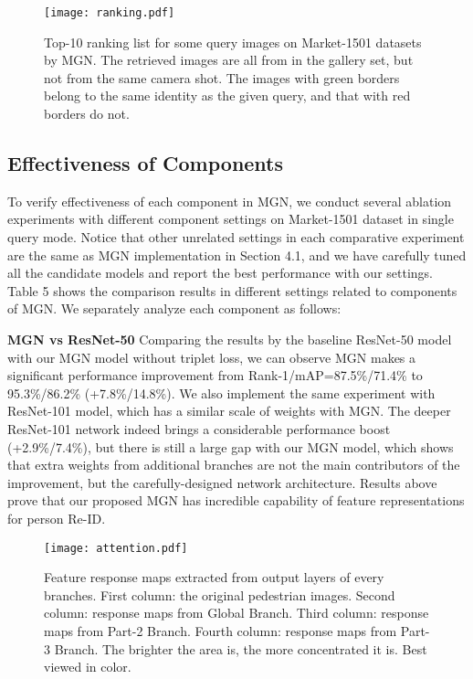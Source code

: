 \documentclass[sigconf]{acmart}
\begin{document}
\begin{figure*}
	\texttt{[image: ranking.pdf]}
	\caption{Top-10 ranking list for some query images on Market-1501 datasets by MGN. The retrieved images are all from in the gallery set, but not from the same camera shot. The images with green borders belong to the same identity as the given query, and that with red borders do not. }
\end{figure*}

\subsection{Effectiveness of Components}
To verify effectiveness of each component in MGN, we conduct several ablation experiments with different component settings on Market-1501 dataset in single query mode. Notice that other unrelated settings in each comparative experiment are the same as MGN implementation in Section 4.1, and we have carefully tuned all the candidate models and report the best performance with our settings. Table 5 shows the comparison results in different settings related to components of MGN. We separately analyze each component as follows: 

\textbf{MGN vs ResNet-50} Comparing the results by the baseline ResNet-50 model with our MGN model without triplet loss, we can observe MGN makes a significant performance improvement from Rank-1/mAP=87.5\%/71.4\% to 95.3\%/86.2\% (+7.8\%/14.8\%). We also implement the same experiment with ResNet-101 model, which has a similar scale of weights with MGN. The deeper ResNet-101 network indeed brings a considerable performance boost (+2.9\%/7.4\%), but there is still a large gap with our MGN model, which shows that extra weights from additional branches are not the main contributors of the improvement, but the carefully-designed network architecture. Results above prove that our proposed MGN has incredible capability of feature representations for person Re-ID.

\begin{figure}
	\texttt{[image: attention.pdf]}
	\caption{Feature response maps extracted from output layers of every branches. First column: the original pedestrian images. Second column: response maps from Global Branch. Third column: response maps from Part-2 Branch. Fourth column: response maps from Part-3 Branch. The brighter the area is, the more concentrated it is. Best viewed in color. }
\end{figure}
\end{document}
